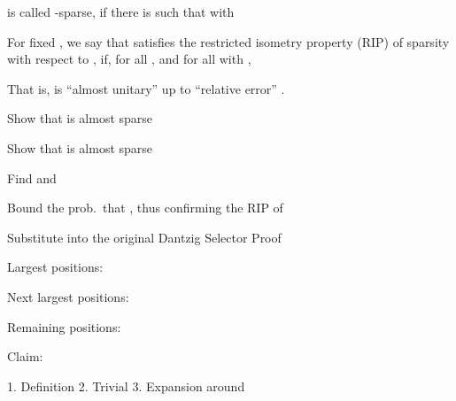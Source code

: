 
{
\I {} is called -sparse, if there is  such that
with
}

\page[yes] %

{
\I For fixed , we say that \m {\M{\Phi}} satisfies the restricted isometry property (RIP) of sparsity  with respect to , if, for all , and for all  with ,

\I That is, \m {\Phi} is ``almost unitary'' up to ``relative error'' .
}

\page[yes] %

{
\I Show that  is almost sparse

\I Show that  is almost sparse

\I Find  and 

\I Bound the prob.\ that , thus confirming the RIP of 

\I Substitute  into the original Dantzig Selector Proof
}

\page[yes] %

{
\I Largest  positions: 

\I Next largest  positions: 

\I Remaining positions: 

\I Claim:
}

\page[yes] %

{

1. Definition 2. Trivial 3. Expansion around 
}


